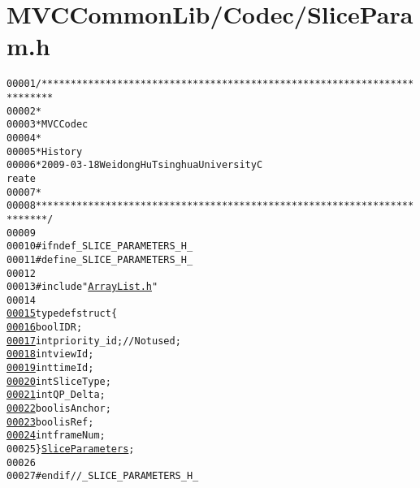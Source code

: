 \hypertarget{_slice_param_8h_source}{
\section{MVCCommonLib/Codec/SliceParam.h}
}


\begin{footnotesize}\begin{alltt}
00001 \textcolor{comment}{/************************************************************************}
00002 \textcolor{comment}{ *}
00003 \textcolor{comment}{ * MVC Codec}
00004 \textcolor{comment}{ * }
00005 \textcolor{comment}{ * History}
00006 \textcolor{comment}{ * 2009-03-18           Weidong Hu              Tsinghua University             C
      reate}
00007 \textcolor{comment}{ * }
00008 \textcolor{comment}{ ************************************************************************/}
00009 
00010 \textcolor{preprocessor}{#ifndef \_SLICE\_PARAMETERS\_H\_}
00011 \textcolor{preprocessor}{}\textcolor{preprocessor}{#define \_SLICE\_PARAMETERS\_H\_}
00012 \textcolor{preprocessor}{}
00013 \textcolor{preprocessor}{#include "\hyperlink{_array_list_8h}{ArrayList.h}"}
00014 
\hypertarget{_slice_param_8h_source_l00015}{}\hyperlink{struct_slice_parameters}{00015} \textcolor{keyword}{typedef} \textcolor{keyword}{struct }\{
\hypertarget{_slice_param_8h_source_l00016}{}\hyperlink{struct_slice_parameters_a60f8fe21acd611ec6892e47a2c6029e3}{00016}         \textcolor{keywordtype}{bool} IDR;
\hypertarget{_slice_param_8h_source_l00017}{}\hyperlink{struct_slice_parameters_a82aa216a74ffaa7d1859aa1cfe135a8b}{00017}         \textcolor{keywordtype}{int} priority\_id; \textcolor{comment}{// Not used;}
\hypertarget{_slice_param_8h_source_l00018}{}\hyperlink{struct_slice_parameters_ae570f1ba10b1e091c7519264534a7143}{00018}         \textcolor{keywordtype}{int} viewId;
\hypertarget{_slice_param_8h_source_l00019}{}\hyperlink{struct_slice_parameters_ad6a26fe2f228235e4f0c31c336cf5e12}{00019}         \textcolor{keywordtype}{int} timeId;
\hypertarget{_slice_param_8h_source_l00020}{}\hyperlink{struct_slice_parameters_a8ab83c948c5e095477d918c0664fce0a}{00020}         \textcolor{keywordtype}{int} SliceType;
\hypertarget{_slice_param_8h_source_l00021}{}\hyperlink{struct_slice_parameters_a5ca0d343251519b63746af21c1cb9f70}{00021}         \textcolor{keywordtype}{int} QP\_Delta;
\hypertarget{_slice_param_8h_source_l00022}{}\hyperlink{struct_slice_parameters_af8a7ea94e92b177c38277af8b827eb62}{00022}         \textcolor{keywordtype}{bool} isAnchor;
\hypertarget{_slice_param_8h_source_l00023}{}\hyperlink{struct_slice_parameters_a7e551828136a39ab347f77457aa11dbb}{00023}         \textcolor{keywordtype}{bool} isRef;
\hypertarget{_slice_param_8h_source_l00024}{}\hyperlink{struct_slice_parameters_a20319af06c76e833936a009f3c38d4ef}{00024}         \textcolor{keywordtype}{int} frameNum;
00025 \} \hyperlink{struct_slice_parameters}{SliceParameters};
00026 
00027 \textcolor{preprocessor}{#endif //\_SLICE\_PARAMETERS\_H\_}
\end{alltt}\end{footnotesize}
